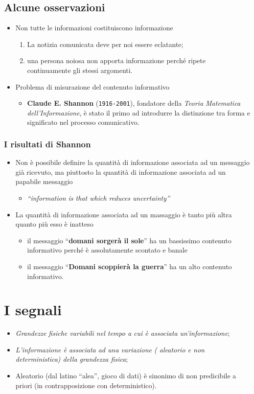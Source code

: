 \documentclass{book}
\begin{document}
\subsection{Alcune osservazioni}
\begin{itemize}
	\item Non tutte le informazioni costituiscono informazione
		\begin{enumerate}
			\item La notizia comunicata deve per noi essere eclatante;
			\item una persona noiosa non apporta informazione perché ripete
				continuamente gli stessi argomenti.
		\end{enumerate}
	\item Problema di misurazione del contenuto informativo
		\begin{itemize}
			\item {\bf Claude E. Shannon} ({\tt 1916-2001}), fondatore della
				\textit{Teoria Matematica dell'Informazione}, è stato il primo
				ad introdurre la distinzione tra forma e significato nel
				processo comunicativo.
		\end{itemize}
\end{itemize}
\subsubsection{I risultati di Shannon}
\begin{itemize}
	\item Non è possibile definire la quantità di informazione associata ad un
		messaggio già ricevuto, ma piuttosto la quantità di informazione
		associata ad un papabile messaggio
		\begin{itemize}
			\item \textit{``information is that which reduces uncertainty''}
		\end{itemize}
	\item La quantità di informazione associata ad un massaggio è tanto più
		altra quanto più esso è inatteso
		\begin{itemize}
			\item il messaggio ``{\bf domani sorgerà il sole}'' ha un bassissimo
				contenuto informativo perché è assolutamente scontato e banale
			\item il messaggio ``{\bf Domani scoppierà la guerra}'' ha un alto
				contenuto informativo.
		\end{itemize}
\end{itemize}
\section{I segnali}
\begin{itemize}
	\item \textit{Grandezze fisiche variabili nel tempo a cui è associata
		un'informazione};
	\item \textit{L'informazione è associata ad una variazione ({\color{red}
		aleatorio} e non deterministica) della grandezza fisica};
	\item Aleatorio (dal latino ``alea'', gioco di dati) è sinonimo di non
		predicibile a priori (in contrapposizione con deterministico).
\end{itemize}
\end{document}

